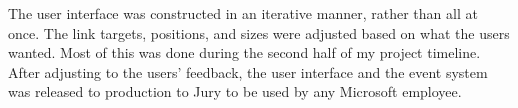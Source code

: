 The user interface was constructed in an iterative manner, rather than all at once. The link targets, positions, and sizes were adjusted based on what the users wanted. Most of this was done during the second half of my project timeline.
After adjusting to the users' feedback, the user interface and the event system was released to production to Jury to be used by any Microsoft employee.

\\
\\
\\
\\
\\
\\
\\
\\
